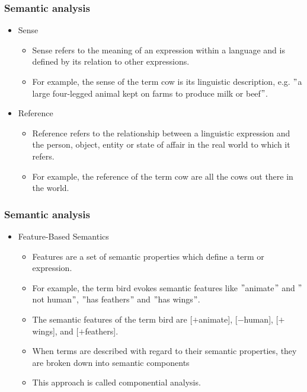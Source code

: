 \documentclass[12pt, table]{beamer}
\begin{document}
\begin{frame}
\frametitle{Semantic analysis}
\begin{itemize}
\item Sense	
\begin{itemize}
\item Sense refers to the meaning of an expression within a language and is defined by its relation to other expressions.
\item For example, the sense of the term cow is its linguistic description, e.g. $"$a large four-legged animal kept on farms to produce milk or beef$"$.
\end{itemize}
\item Reference
\begin{itemize}
\item Reference refers to the relationship between a  linguistic expression and the person, object, entity or state of affair in the real world to which it refers.
\item For example, the reference of the term cow are all the cows out there in the world.
\end{itemize}
\end{itemize}
\end{frame}

\begin{frame}
\frametitle{Semantic analysis}
\begin{itemize}
\item Feature-Based Semantics	
\begin{itemize}
\item Features are a set of semantic properties which define a term or expression. 
\item For example, the term bird evokes semantic features like $"$animate$"$ and $"$not human$"$, $"$has feathers$"$ and $"$has wings$"$.	
\item The semantic features of the term bird are [$+$animate], [$-$human], [$+$wings], and [$+$feathers].
\item When terms are described with regard to their semantic properties, they are broken down into semantic components
\item This approach is called componential analysis.
\end{itemize}
\end{itemize}
\end{frame}
\end{document}
